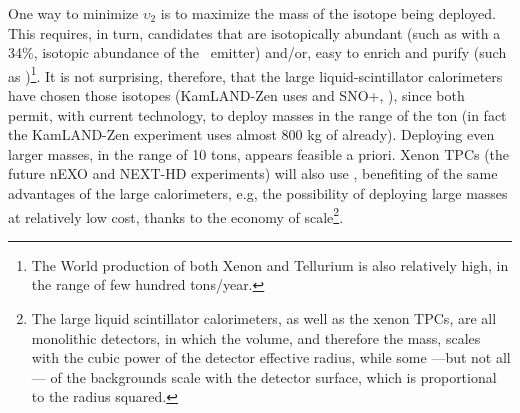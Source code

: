 One way to minimize $\upsilon_2$ is to maximize the mass of the isotope being deployed. This requires, in turn, candidates that are isotopically abundant (such as 
 with a 34\%, isotopic abundance of the \bb\ emitter) and/or, easy to enrich and purify (such as )\footnote{The World production of both Xenon and Tellurium is also relatively high, in the range of few hundred tons/year.}.
%
%
It is not surprising, therefore, that the large liquid-scintillator calorimeters have chosen those isotopes (KamLAND-Zen uses  and SNO+, ), since both permit, with current technology, to deploy masses in the range of the ton (in fact the KamLAND-Zen experiment uses almost 800 kg of  already). Deploying even larger masses, in the range of 10 tons, appears feasible a priori. Xenon TPCs (the future nEXO and NEXT-HD experiments) will also use , benefiting of the same advantages of the large calorimeters, e.g, the possibility of deploying large masses at relatively low cost, thanks to the economy of scale\footnote{The large liquid scintillator calorimeters, as well as the xenon TPCs, are all monolithic detectors, in which the volume, and therefore the mass, scales with the cubic power of the detector effective radius, while some ---but not all--- of the backgrounds scale with the detector surface, which is proportional to the radius squared.}. 



